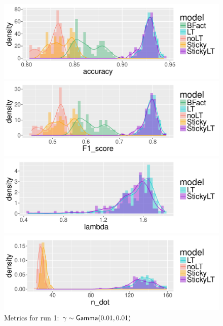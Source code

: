 \begin{figure}[tb]
  \centering
  \begin{minipage}{0.75\textwidth}
  \includegraphics[width = \textwidth]{fig/cocktail/synth_s16_m12/hyper_gamma/h10.0_nocs_cp0/a0p01b0p01/accuracy_density.pdf}
\end{minipage}

\begin{minipage}{0.75\textwidth}
  \includegraphics[width = \textwidth]{fig/cocktail/synth_s16_m12/hyper_gamma/h10.0_nocs_cp0/a0p01b0p01/F1_score_density.pdf}
\end{minipage}

\begin{minipage}{0.75\textwidth}
  \includegraphics[width = \textwidth]{fig/cocktail/synth_s16_m12/hyper_gamma/h10.0_nocs_cp0/a0p01b0p01/lambda_density.pdf}
\end{minipage}

\begin{minipage}{0.75\textwidth}
  \includegraphics[width = \textwidth]{fig/cocktail/synth_s16_m12/hyper_gamma/h10.0_nocs_cp0/a0p01b0p01/n_dot_density.pdf}
\end{minipage}
\caption{Metrics for run 1: $\gamma \sim \mathsf{Gamma}(0.01,0.01)$}
\end{figure}

